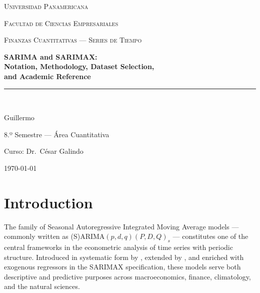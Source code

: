 \documentclass[12pt,a4paper]{article}
\begin{document}

\begin{titlepage}
\centering
\vspace*{2cm}
{\scshape\Large Universidad Panamericana \par}
{\scshape\large Facultad de Ciencias Empresariales \par}
{\scshape\large Finanzas Cuantitativas — Series de Tiempo \par}
\vspace{2cm}
{\Huge\bfseries SARIMA and SARIMAX:\\[0.4em]
\large Notation, Methodology, Dataset Selection,\\ and Academic Reference \par}
\vspace{2cm}
\rule{0.5\textwidth}{0.4pt}\\[0.5cm]
{\large Guillermo \par}
{\large 8.º Semestre — Área Cuantitativa \par}
\vspace{1cm}
{\large Curso: Dr.\ César Galindo \par}
\vspace{2cm}
{\large \today \par}
\vfill
\end{titlepage}

\tableofcontents
\newpage

\section{Introduction}

The family of Seasonal Autoregressive Integrated Moving Average models — commonly
written as (S)ARIMA$(p,d,q)(P,D,Q)_s$ — constitutes one of the central
frameworks in the econometric analysis of time series with periodic structure.
Introduced in systematic form by \citet{BoxJenkins1976}, extended by
\citet{BoxJenkinsReinsel2015}, and enriched with exogenous regressors in the
SARIMAX specification, these models serve both descriptive and predictive
purposes across macroeconomics, finance, climatology, and the natural sciences.
\end{document}
